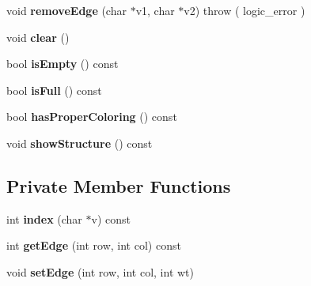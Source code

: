 \begin{DoxyCompactItemize}
\item 
\hypertarget{class_wt_graph_a7a1e566285ce7faefd211ba0d9ffa864}{void {\bfseries remove\+Edge} (char $\ast$v1, char $\ast$v2)  throw ( logic\+\_\+error )}\label{class_wt_graph_a7a1e566285ce7faefd211ba0d9ffa864}

\item 
\hypertarget{class_wt_graph_ad73f37d58e6e5132fbf6191b35e54e4e}{void {\bfseries clear} ()}\label{class_wt_graph_ad73f37d58e6e5132fbf6191b35e54e4e}

\item 
\hypertarget{class_wt_graph_ad521755a01e89cfd9e6cb4f3f0b8393b}{bool {\bfseries is\+Empty} () const }\label{class_wt_graph_ad521755a01e89cfd9e6cb4f3f0b8393b}

\item 
\hypertarget{class_wt_graph_a2afac3672a8dd457da6dccc899e0a7f9}{bool {\bfseries is\+Full} () const }\label{class_wt_graph_a2afac3672a8dd457da6dccc899e0a7f9}

\item 
\hypertarget{class_wt_graph_aad6215139213038e86eb7da9a3d6d2e6}{bool {\bfseries has\+Proper\+Coloring} () const }\label{class_wt_graph_aad6215139213038e86eb7da9a3d6d2e6}

\item 
\hypertarget{class_wt_graph_aff09483a06de871dab7be3b5fb6a9f51}{void {\bfseries show\+Structure} () const }\label{class_wt_graph_aff09483a06de871dab7be3b5fb6a9f51}

\end{DoxyCompactItemize}
\subsection*{Private Member Functions}
\begin{DoxyCompactItemize}
\item 
\hypertarget{class_wt_graph_a89dc6b3fdf5bd826cf82c1e0b6342fa4}{int {\bfseries index} (char $\ast$v) const }\label{class_wt_graph_a89dc6b3fdf5bd826cf82c1e0b6342fa4}

\item 
\hypertarget{class_wt_graph_ace3f881c28ca9f26ef6e30da4bb40ef7}{int {\bfseries get\+Edge} (int row, int col) const }\label{class_wt_graph_ace3f881c28ca9f26ef6e30da4bb40ef7}

\item 
\hypertarget{class_wt_graph_afe8dc83bbd09697988cad1c61439da80}{void {\bfseries set\+Edge} (int row, int col, int wt)}\label{class_wt_graph_afe8dc83bbd09697988cad1c61439da80}

\end{DoxyCompactItemize}
